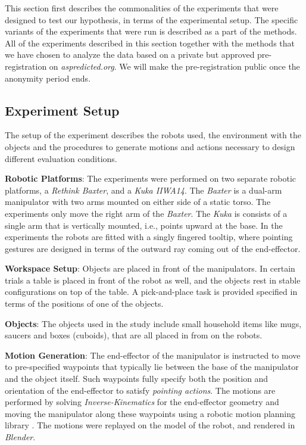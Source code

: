This section first describes the commonalities of the experiments that were designed to test our hypothesis, in terms of the experimental setup. The specific variants of the experiments that were run is described as a part of the methods. 
All of the experiments described in this section together with the methods that we have chosen to analyze the data based on a private but approved pre-registration on \textit{aspredicted.org}. We will make the pre-registration public once the anonymity period ends.

\subsection{Experiment Setup}
The setup of the experiment describes the robots used, the environment with the objects and the procedures to generate motions and actions necessary to design different evaluation conditions.

\noindent\textbf{Robotic Platforms}: The experiments were performed on two separate robotic platforms, a \textit{Rethink Baxter}, and a \textit{Kuka IIWA14}.
The \textit{Baxter} is a dual-arm manipulator with two arms mounted on either side of a static torso. The experiments only move the right arm of the \textit{Baxter}. The \textit{Kuka} is consists of a single arm that is vertically mounted, i.e., points upward at the base. In the experiments the robots are fitted with a singly fingered tooltip, where pointing gestures are designed in terms of the outward ray coming out of the end-effector.



\noindent\textbf{Workspace Setup}: Objects are placed in front of the manipulators. In certain trials a table is placed in front of the robot as well, and the objects rest in stable configurations on top of the table. A pick-and-place task is provided specified in terms of the positions of one of the objects. 

\noindent\textbf{Objects}: The objects used in the study include small household items like mugs, saucers and boxes (cuboids), that are all placed in from on the robots.

\noindent\textbf{Motion Generation}: The end-effector of the manipulator is instructed to move to pre-specified waypoints that typically lie between the base of the manipulator and the object itself. Such waypoints fully specify both the position and orientation of the end-effector to satisfy \textit{pointing actions}. The motions are performed by solving \textit{Inverse-Kinematics} for the end-effector geometry and moving the manipulator along these waypoints using a robotic motion planning library \cite{littlefield2014extensible}. The motions were replayed on the model of the robot, and rendered in \textit{Blender}.

